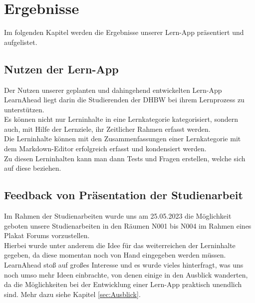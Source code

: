 \section{Ergebnisse}
Im folgenden Kapitel werden die Ergebnisse unserer Lern-App präsentiert und aufgelistet.
\subsection{Nutzen der Lern-App}
Der Nutzen unserer geplanten und dahingehend entwickelten Lern-App LearnAhead liegt darin die Studierenden der DHBW bei ihrem Lernprozess zu unterstützen.\\
Es können nicht nur Lerninhalte in eine Lernkategorie kategorisiert, sondern auch, mit Hilfe der Lernziele, ihr Zeitlicher Rahmen erfasst werden.\\
Die Lerninhalte können mit den Zusammenfassungen einer Lernkategorie mit dem Markdown-Editor erfolgreich erfasst und kondensiert werden.\\
Zu diesen Lerninhalten kann man dann Tests und Fragen erstellen, welche sich auf diese beziehen.
\subsection{Feedback von Präsentation der Studienarbeit}
Im Rahmen der Studienarbeiten wurde uns am 25.05.2023 die Möglichkeit geboten unsere Studienarbeiten in den Räumen N001 bis N004 im Rahmen eines Plakat Forums vorzustellen. \\
Hierbei wurde unter anderem die Idee für das weiterreichen der Lerninhalte gegeben, da diese momentan noch von Hand eingegeben werden müssen.\\
LearnAhead stoß auf großes Interesse und es wurde vieles hinterfragt, was uns noch umso mehr Ideen einbrachte, von denen einige in den Ausblick wanderten, da die Möglichkeiten bei der Entwicklung einer Lern-App praktisch unendlich sind. Mehr dazu siehe Kapitel \ref{sec:Ausblick}.\\
